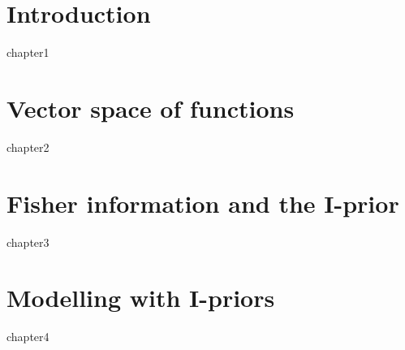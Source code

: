 \documentclass[a4paper,showframe,11pt]{report}
\begin{document}
\hTOCandLists
\clearpage


\chapter{Introduction} 
{chapter1}

\chapter{Vector space of functions}
{chapter2}

\chapter{Fisher information and the I-prior}
{chapter3}

\chapter{Modelling with I-priors}
{chapter4}

%
%
%
%
%
\end{document}
